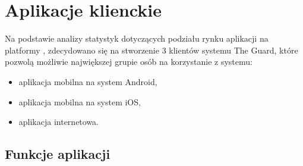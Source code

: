 \chapter{Aplikacje klienckie}

Na podstawie analizy statystyk dotyczących podziału rynku aplikacji na platformy \cite{stats}, zdecydowano się na stworzenie 3 klientów systemu The Guard, które pozwolą możliwie największej grupie osób na korzystanie z systemu:
\begin{itemize}
\item aplikacja mobilna na system Android,
\item aplikacja mobilna na system iOS,
\item aplikacja internetowa.
\end{itemize}

\section{Funkcje aplikacji}
